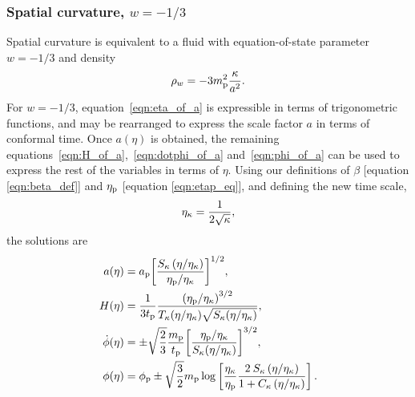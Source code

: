 \subsubsection{Spatial curvature, $w=-1/3$}
Spatial curvature is equivalent to a fluid with equation-of-state parameter $w=-1/3$ and density
%
\begin{equation}
  \rho_w = -3m_{\mathrm{p}}^2\frac{\kappa}{a^{2}}.
\end{equation}
%
For $w=-1/3$, equation~\eqref{eqn:eta_of_a} is expressible in terms of trigonometric functions, and may be rearranged to express the scale factor $a$ in terms of conformal time. Once $a(\eta)$ is obtained, the remaining equations~\eqref{eqn:H_of_a},~\eqref{eqn:dotphi_of_a} and~\eqref{eqn:phi_of_a} can be used to express the rest of the variables in terms of $\eta$. Using our definitions of $\beta$ [equation \nolinebreak\ref{eqn:beta_def}] and $\eta_{\mathrm{p}}$ [equation \nolinebreak\ref{eqn:etap_eq}], and defining the new time scale,
%
\begin{equation}
  \eta_\mathrm{\kappa} = \frac{1}{2\sqrt{\kappa}},
  \label{eqn:etak}
\end{equation}
%
the solutions are 
%
\begin{align}
  a(\eta)
  &=
  a_{\mathrm{p}}{\left[
  \frac
  {S_\kappa\left(\eta/\eta_\mathrm{\kappa}\right)}
  {\eta_{\mathrm{p}}/\eta_\mathrm{\kappa}} \right]}^{1/2},
  \\
  H(\eta)
  &=
  \frac{1}{3t_{\mathrm{p}}}
  \frac{{(\eta_{\mathrm{p}}/\eta_\mathrm{\kappa})}^{3/2}}
  {T_\kappa(\eta/\eta_\mathrm{\kappa})\sqrt{S_\kappa(\eta/\eta_\mathrm{\kappa})}}, 
  \\
  \dot{\phi}(\eta)
  &=
  \pm\sqrt{\frac{2}{3}}
  \frac{m_{\mathrm{p}}}{t_{\mathrm{p}}}
  {\left[
  \frac
  {\eta_{\mathrm{p}}/\eta_\mathrm{\kappa}}
  {S_{\kappa}(\eta/\eta_\mathrm{\kappa})}
  \right]}^{3/2},
  \\
  \phi(\eta) 
  &=
  \phi_{\mathrm{p}} \pm \sqrt{\frac{3}{2}}m_{\mathrm{p}}\log  \left[
  \frac{\eta_\mathrm{\kappa}}{\eta_{\mathrm{p}}} 
  \frac{2\:S_{\kappa}\left(\eta/\eta_\mathrm{\kappa} \right) }
  {1 + C_{\kappa} \left( \eta/\eta_\mathrm{\kappa} \right)   }  
  \right]. 
\end{align}
%



